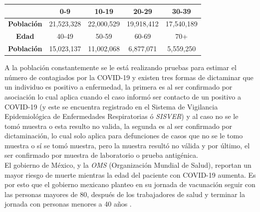 \documentclass[12pt,a4paper]{article}
\begin{document}
\begin{center}
    \begin{tabular}{|c|c|c|c|c|}
\hline
\rowcolor[HTML]{C0C0C0} 
\multicolumn{1}{|c|}{\cellcolor[HTML]{C0C0C0}\textbf{Edad}}      & 0-9        & 10-19      & 20-29      & 30-39      \\ \hline
\multicolumn{1}{|c|}{\cellcolor[HTML]{C0C0C0}\textbf{Población}} & 21,523,328 & 22,000,529 & 19,918,412 & 17,540,189 \\ \hline
\rowcolor[HTML]{C0C0C0} 
\cellcolor[HTML]{C0C0C0}\textbf{Edad}                                     & 40-49      & 50-59      & 60-69      & 70+        \\ \hline
\cellcolor[HTML]{C0C0C0}\textbf{Población}                                & 15,023,137 & 11,002,068 & 6,877,071  & 5,559,250  \\ \hline

\end{tabular} 
\end{center}
A la población constantemente se le está realizando pruebas para estimar el número de contagiados por la COVID-19 y existen tres formas de dictaminar que un individuo es positivo a enfermedad, la primera es al ser confirmado por asociación lo cual aplica cuando el caso informó ser contacto de un positivo a COVID-19 (y este se encuentra registrado en el Sistema de Vigilancia Epidemiológica de Enfermedades Respiratorias ó \textit{SISVER}) y al caso no se le tomó muestra o esta resulto no valida, la segunda es al ser confirmado por dictaminación, lo cual solo aplica para defunciones de casos
que no se le tomo muestra o sí se tomó muestra, pero la muestra resultó no válida y por último, el ser confirmado por muestra de laboratorio o prueba antigénica. \citep{ss} \\

El gobierno de México, y la \textit{OMS} (Organización Mundial de Salud), reportan un mayor riesgo de muerte mientras la edad del paciente con COVID-19 aumenta. Es por esto que el gobierno mexicano planteo en su jornada de vacunación seguir con las personas mayores de 80, después de los trabajadores de salud y terminar la jornada con personas menores a 40 años \citep{GTAV}.

\setlength{\parindent}{1cm}

\end{document}
